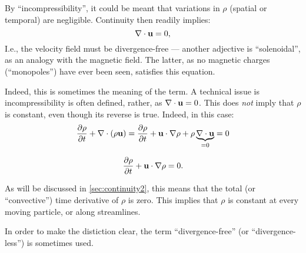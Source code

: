 By ``incompressibility'', it could be meant
that variations in $\rho$ (spatial or temporal) are
negligible. Continuity then readily implies:
\[
\nabla \cdot  \mathbf{u}  = 0 ,
\]
I.e., the velocity field must be divergence-free --- another adjective
is ``solenoidal'', as an analogy with the magnetic field. The latter,
as no magnetic charges (``monopoles'') have ever been seen, satisfies
this equation.

Indeed, this is sometimes the meaning of the term.  A technical issue
is incompressibility is often defined, rather, as
$\nabla \cdot \mathbf{u} = 0 $. This does \emph{not} imply that $\rho$ is
constant, even though its reverse is true. Indeed, in this case:
\[
\frac{\partial \rho }{\partial t} +  \nabla \cdot (\rho \mathbf{u} ) =
\frac{\partial \rho }{\partial t} +   \mathbf{u} \cdot \nabla \rho
+ \rho \underbrace{\nabla \cdot \mathbf{u}}_{=0} = 0
\]

\[
\frac{\partial \rho }{\partial t} +   \mathbf{u} \cdot \nabla \rho = 0 .
\]

As will be discussed in \ref{sec:continuity2}, this means that the
total (or ``convective'') time derivative of $\rho$ is zero. This
implies that $\rho$ is constant at every moving particle, or along
streamlines.

In order to make the distiction clear, the term ``divergence-free'' (or
``divergence-less'') is sometimes used.